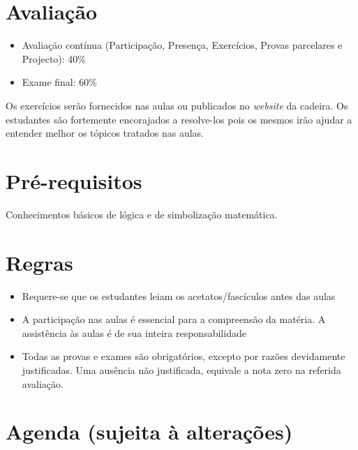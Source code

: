 \section*{Avaliação}%
\begin{itemize}
  \item Avaliação contínua (Participação, Presença, Exercícios, Provas
  parcelares e Projecto): 40\%
  \item Exame final: 60\%
\end{itemize}

Os exercícios serão fornecidos nas aulas ou publicados no \emph{website} da cadeira. Os estudantes são fortemente encorajados
a resolve-los pois os mesmos irão ajudar a entender melhor os tópicos tratados nas aulas.
%
\section*{Pré-requisitos}

Conhecimentos básicos de lógica e de simbolização matemática.

\section*{Regras}

\begin{itemize}
  \item {Requere-se que os estudantes leiam os acetatos/fascículos antes das
  aulas}
  \item {A participação nas aulas é essencial para a compreensão da matéria. A assistência às aulas é de sua inteira
  responsabilidade}
  \item {Todas as provas e exames são obrigatórios, excepto por razões devidamente justificadas. Uma ausência não justificada, 
  equivale a nota zero na referida avaliação.}
\end{itemize}

\section*{Agenda (sujeita à alterações)}

